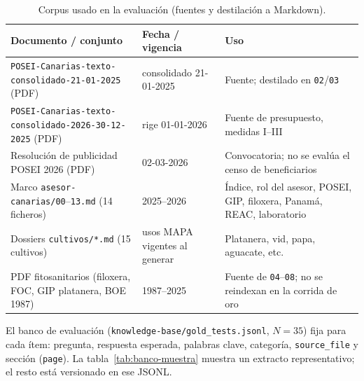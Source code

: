 \begin{table}[htbp]
\centering
\caption{Corpus usado en la evaluación (fuentes y destilación a Markdown).}
\label{tab:corpus}
\small
\begin{tabular}{p{4.4cm}p{2.2cm}p{7.0cm}}
\toprule
\textbf{Documento / conjunto} & \textbf{Fecha / vigencia} & \textbf{Uso} \\
\midrule
\texttt{POSEI-Canarias-texto-consolidado-21-01-2025} (PDF) & consolidado 21-01-2025 & Fuente; destilado en \texttt{02}/\texttt{03} \\
\texttt{POSEI-Canarias-texto-consolidado-2026-30-12-2025} (PDF) & rige 01-01-2026 & Fuente de presupuesto, medidas I--III \\
Resolución de publicidad POSEI 2026 (PDF) & 02-03-2026 & Convocatoria; no se evalúa el censo de beneficiarios \\
Marco \texttt{asesor-canarias/00}--\texttt{13.md} (14 ficheros) & 2025--2026 & Índice, rol del asesor, POSEI, GIP, filoxera, Panamá, REAC, laboratorio \\
Dossiers \texttt{cultivos/*.md} (15 cultivos) & usos MAPA vigentes al generar & Platanera, vid, papa, aguacate, etc. \\
PDF fitosanitarios (filoxera, FOC, GIP platanera, BOE 1987) & 1987--2025 & Fuente de \texttt{04}--\texttt{08}; no se reindexan en la corrida de oro \\
\bottomrule
\end{tabular}
\end{table}

El banco de evaluación (\texttt{knowledge-base/gold\_tests.jsonl}, $N=35$) fija para cada ítem: pregunta, respuesta esperada, palabras clave, categoría, \texttt{source\_file} y sección (\texttt{page}). La tabla~\ref{tab:banco-muestra} muestra un extracto representativo; el resto está versionado en ese JSONL.

